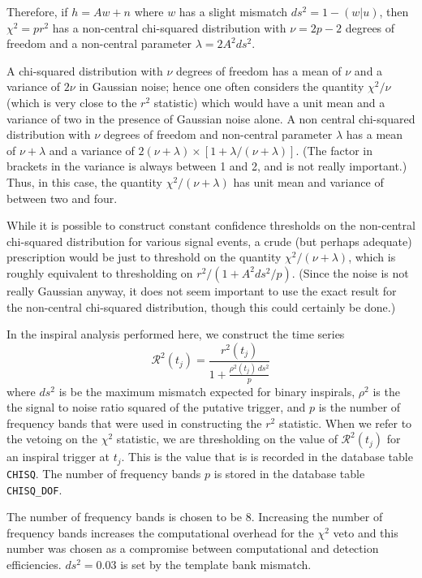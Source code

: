 Therefore, if $h=Aw+n$ where $w$ has a slight mismatch $ds^2=1-(w|u)$, then
$\chi^2=pr^2$ has a non-central chi-squared distribution with $\nu=2p-2$
degrees of freedom and a non-central parameter $\lambda=2A^2ds^2$.

A chi-squared distribution with $\nu$ degrees of freedom has a mean of
$\nu$ and a variance of $2\nu$ in Gaussian noise; hence one often considers
the quantity $\chi^2/\nu$ (which is very close to the $r^2$ statistic) which
would have a unit mean and a variance of two in the presence of Gaussian
noise alone.  A non central chi-squared distribution with $\nu$ degrees of
freedom and non-central parameter $\lambda$ has a mean of $\nu+\lambda$ and
a variance of $2(\nu+\lambda)\times[1+\lambda/(\nu+\lambda)]$.  (The factor
in brackets in the variance is always between 1 and 2, and is not really
important.)  Thus, in this case, the quantity $\chi^2/(\nu+\lambda)$ has
unit mean and variance of between two and four.

While it is possible to construct constant confidence thresholds on the
non-central chi-squared distribution for various signal events, a crude
(but perhaps adequate) prescription would be just to threshold on the
quantity $\chi^2/(\nu+\lambda)$, which is roughly equivalent to thresholding
on $r^2/(1+A^2ds^2/p)$.  (Since the noise is not really Gaussian anyway,
it does not seem important to use the exact result for the non-central
chi-squared distribution, though this could certainly be done.)

In the inspiral analysis performed here, we construct the time series
\begin{equation}
\mathcal{R}^2(t_j) = \frac{r^2(t_j)}{1+\frac{\rho^2(t_j)\,ds^2}{p}}
\label{e:modified-chisq}
\end{equation}
where $ds^2$ is be the maximum mismatch expected for binary inspirals,
$\rho^2$ is the the signal to noise ratio squared of the putative trigger, and
$p$ is the number of frequency bands that were used in constructing the $r^2$
statistic.  When we refer to the vetoing on the $\chi^2$ statistic, we are
thresholding on the value of $\mathcal{R}^2(t_j)$ for an inspiral trigger at
$t_j$. This is the value that is is recorded in the database table
\verb|CHISQ|. The number of frequency bands $p$ is stored in the database
table \verb|CHISQ_DOF|.

The number of frequency bands is chosen to be 8. Increasing the number of
frequency bands increases the computational overhead for the $\chi^2$ veto and
this number was chosen as a compromise between computational and detection
efficiencies. $ds^2 = 0.03$ is set by the template bank mismatch. 


